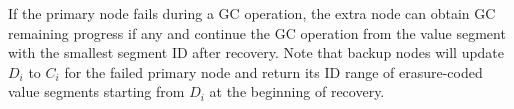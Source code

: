 If the primary node fails during a GC operation, the
extra node can obtain GC remaining progress if any and continue the GC operation from the value
segment with the smallest segment ID after recovery.
Note that backup nodes will update $D_i$ to $C_i$ for the failed primary node and return its ID
range of erasure-coded value segments starting from $D_i$ at the beginning of recovery.